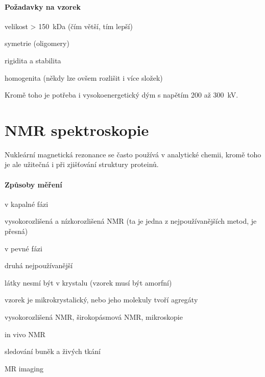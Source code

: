 \documentclass[DIV=8]{scrreprt}
\begin{document}
\paragraph{Požadavky na vzorek}
\begin{myItemize}[nosep]
    \item velikost > \si{150 kDa} (čím větší, tím lepší)
    \item symetrie (oligomery)
    \item rigidita a stabilita
    \item homogenita (někdy lze ovšem rozlišit i více složek)
\end{myItemize}



Kromě toho je potřeba i vysokoenergetický dým s napětím \si{200} až \si{300 kV}.

\section{NMR spektroskopie} \label{NMR spektroskopie} \FloatBarrier


Nukleární magnetická rezonance se často používá v analytické chemii, kromě toho je ale užitečná i při zjišťování struktury proteinů.

\paragraph{Způsoby měření}
\begin{myItemize}[nosep]
    \item v kapalné fázi
\begin{myItemize}[nosep]
    \item vysokorozlišená a nízkorozlišená NMR (ta je jedna z nejpoužívanějších metod, je přesná)
\end{myItemize}

    \item v pevné fázi
\begin{myItemize}[nosep]
    \item druhá nejpoužívanější
    \item látky nesmí být v krystalu (vzorek musí být amorfní)
    \item vzorek je mikrokrystalický, nebo jeho molekuly tvoří agregáty
    \item vysokorozlišená NMR, širokopásmová NMR, mikroskopie
\end{myItemize}

    \item in vivo NMR
\begin{myItemize}[nosep]
    \item sledování buněk a živých tkání
    \item MR imaging
\end{myItemize}

\end{myItemize}
\end{document}
